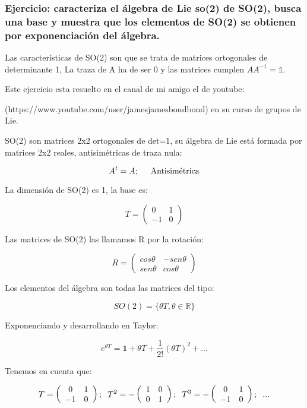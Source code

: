 \documentclass{article}
\begin{document}
         \subsubsection{Ejercicio: caracteriza el álgebra de Lie so(2) de SO(2), busca una base y muestra que los elementos de SO(2) se obtienen por exponenciación del álgebra.}


         Las características de SO(2) son que se trata de matrices ortogonales de determinante 1, La traza de A ha de ser 0 y las matrices cumplen $AA^{-1}=\mathds{1}$.

         Este ejercicio esta resuelto en el canal de mi amigo el de youtube:

         (https://www.youtube.com/user/jamesjamesbondbond) en su curso de grupos de Lie.

         \smallskip
         SO(2) son matrices 2x2 ortogonales de det=1, su álgebra de Lie está formada por matrices 2x2 reales, antisimétricas de traza nula:

         $$A^t=A; \hspace{0.5cm} \text{Antisimétrica}$$

         La dimensión de SO(2) es 1, la base es:

         $$T=\left ( \begin{array}{cc}
             0 &  1\\
             -1 & 0
         \end{array}\right)$$

         Las matrices de SO(2) las llamamos R por la rotación:

         $$R= \left ( \begin{array}{cc}
             cos \theta & -sen \theta \\
            sen \theta  & cos \theta
         \end{array}\right)$$

         Los elementos del álgebra son todas las matrices del tipo:

         $$SO(2)=\lbrace \theta T , \theta \in \mathds{R} \rbrace$$

         Exponenciando y desarrollando en Taylor:

         $$e^{\theta T}= \mathds{1} + \theta T + \frac{1}{2!}(\theta T)^2 + ...$$

         Tenemos en cuenta que:

         $$T=\left ( \begin{array}{cc}
             0 &  1\\
             -1 & 0
         \end{array}\right); \hspace{0.2cm} T^2=-\left ( \begin{array}{cc}
             1 &  0\\
             0 & 1
         \end{array}\right); \hspace{0.2cm} T^3=-\left ( \begin{array}{cc}
             0 &  1\\
             -1 & 0
         \end{array}\right); \hspace{0.2cm} ...$$
\end{document}
